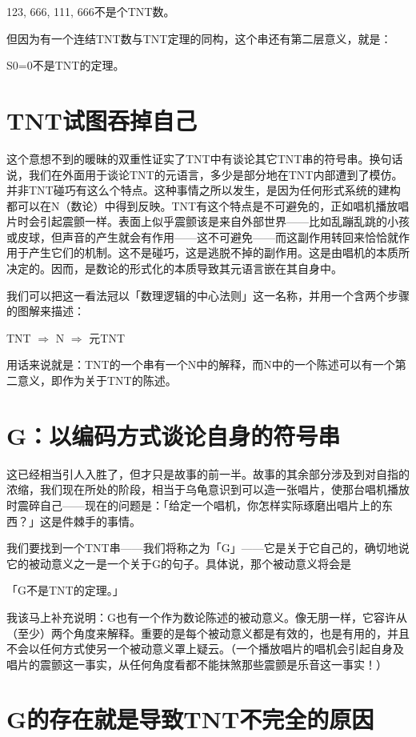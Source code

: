 \documentclass[
  12pt,
  twoside,
  openright,
  oldfontcommands,
]{memoir}
\begin{document}
123, 666, 111, 666不是个TNT数。

但因为有一个连结TNT数与TNT定理的同构，这个串还有第二层意义，就是：

S0=0不是TNT的定理。

\section{TNT试图吞掉自己}

这个意想不到的暖昧的双重性证实了TNT中有谈论其它TNT串的符号串。换句话说，我们在外面用于谈论TNT的元语言，多少是部分地在TNT内部遭到了模仿。并非TNT碰巧有这么个特点。这种事情之所以发生，是因为任何形式系统的建构都可以在N（数论）中得到反映。TNT有这个特点是不可避免的，正如唱机播放唱片时会引起震颤一样。表面上似乎震颤该是来自外部世界------比如乱蹦乱跳的小孩或皮球，但声音的产生就会有作用------这不可避免------而这副作用转回来恰恰就作用于产生它们的机制。这不是碰巧，这是逃脱不掉的副作用。这是由唱机的本质所决定的。因而，是数论的形式化的本质导致其元语言嵌在其自身中。

我们可以把这一看法冠以「数理逻辑的中心法则」这一名称，并用一个含两个步骤的图解来描述：

TNT $\Rightarrow$ N $\Rightarrow$ 元TNT

用话来说就是：TNT的一个串有一个N中的解释，而N中的一个陈述可以有一个第二意义，即作为关于TNT的陈述。

\section{G：以编码方式谈论自身的符号串}

这已经相当引人入胜了，但才只是故事的前一半。故事的其余部分涉及到对自指的浓缩，我们现在所处的阶段，相当于乌龟意识到可以造一张唱片，使那台唱机播放时震碎自己------现在的问题是：「给定一个唱机，你怎样实际琢磨出唱片上的东西？」这是件棘手的事情。

我们要找到一个TNT串------我们将称之为「G」------它是关于它自己的，确切地说它的被动意义之一是一个关于G的句子。具体说，那个被动意义将会是

「G不是TNT的定理。」

我该马上补充说明：G也有一个作为数论陈述的被动意义。像无朋一样，它容许从（至少）两个角度来解释。重要的是每个被动意义都是有效的，也是有用的，并且不会以任何方式使另一个被动意义罩上疑云。（一个播放唱片的唱机会引起自身及唱片的震颤这一事实，从任何角度看都不能抹煞那些震颤是乐音这一事实！）

\section{G的存在就是导致TNT不完全的原因}
\end{document}
